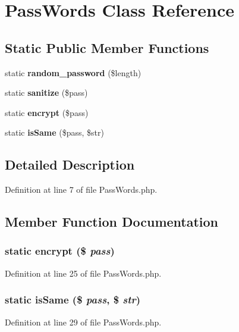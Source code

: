 \section{PassWords Class Reference}
\label{class_pass_words}
\subsection*{Static Public Member Functions}
\begin{DoxyCompactItemize}
\item 
static {\bf random\_\-password} (\$length)
\item 
static {\bf sanitize} (\$pass)
\item 
static {\bf encrypt} (\$pass)
\item 
static {\bf isSame} (\$pass, \$str)
\end{DoxyCompactItemize}


\subsection{Detailed Description}


Definition at line 7 of file PassWords.php.

\subsection{Member Function Documentation}
\subsubsection[{encrypt}]{\setlength{\rightskip}{0pt plus 5cm}static encrypt (\$ {\em pass})\hspace{0.3cm}{\ttfamily  [static]}}\label{class_pass_words_ab0646422c5276f28d093983752dd4988}


Definition at line 25 of file PassWords.php.
\subsubsection[{isSame}]{\setlength{\rightskip}{0pt plus 5cm}static isSame (\$ {\em pass}, \/  \$ {\em str})\hspace{0.3cm}{\ttfamily  [static]}}\label{class_pass_words_a430f73ef1c59ad03b3f147146a94df47}


Definition at line 29 of file PassWords.php.
